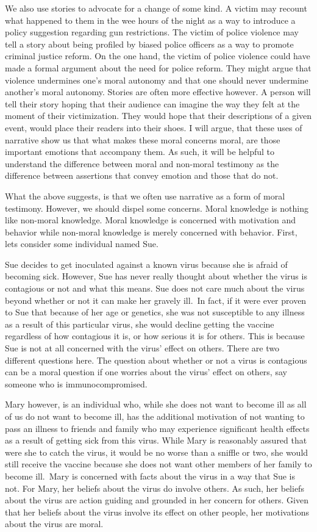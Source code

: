 \documentclass[
  letterpaper,
  DIV=11,
  numbers=noendperiod]{scrartcl}
\theoremstyle{remark}
\begin{document}
We also use stories to advocate for a change of some kind. A victim may
recount what happened to them in the wee hours of the night as a way to
introduce a policy suggestion regarding gun restrictions. The victim of
police violence may tell a story about being profiled by biased police
officers as a way to promote criminal justice reform. On the one hand,
the victim of police violence could have made a formal argument about
the need for police reform. They might argue that violence undermines
one's moral autonomy and that one should never undermine another's moral
autonomy. Stories are often more effective however. A person will tell
their story hoping that their audience can imagine the way they felt at
the moment of their victimization. They would hope that their
descriptions of a given event, would place their readers into their
shoes. I will argue, that these uses of narrative show us that what
makes these moral concerns moral, are those important emotions that
accompany them. As such, it will be helpful to understand the difference
between moral and non-moral testimony as the difference between
assertions that convey emotion and those that do not.

What the above suggests, is that we often use narrative as a form of
moral testimony. However, we should dispel some concerns. Moral
knowledge is nothing like non-moral knowledge. Moral knowledge is
concerned with motivation and behavior while non-moral knowledge is
merely concerned with behavior. First, lets consider some individual
named Sue.

Sue decides to get inoculated against a known virus because she is
afraid of becoming sick. However, Sue has never really thought about
whether the virus is contagious or not and what this means. Sue does not
care much about the virus beyond whether or not it can make her gravely
ill.~In fact, if it were ever proven to Sue that because of her age or
genetics, she was not susceptible to any illness as a result of this
particular virus, she would decline getting the vaccine regardless of
how contagious it is, or how serious it is for others. This is because
Sue is not at all concerned with the virus' effect on others. There are
two different questions here. The question about whether or not a virus
is contagious can be a moral question if one worries about the virus'
effect on others, say someone who is immunocompromised.

Mary however, is an individual who, while she does not want to become
ill as all of us do not want to become ill, has the additional
motivation of not wanting to pass an illness to friends and family who
may experience significant health effects as a result of getting sick
from this virus. While Mary is reasonably assured that were she to catch
the virus, it would be no worse than a sniffle or two, she would still
receive the vaccine because she does not want other members of her
family to become ill.~Mary is concerned with facts about the virus in a
way that Sue is not. For Mary, her beliefs about the virus do involve
others. As such, her beliefs about the virus are action guiding and
grounded in her concern for others. Given that her beliefs about the
virus involve its effect on other people, her motivations about the
virus are moral.
\end{document}

